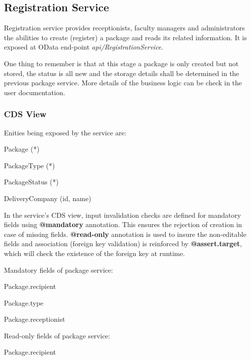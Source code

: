 \subsection{Registration Service}

Registration service provides receptionists, faculty managers and administrators the abilities to create (register) a package and reads its related information. It is exposed at OData end-point \textit{api/RegistrationService}. 

\bigskip
One thing to remember is that at this stage a package is only created but not stored, the status is all new and the storage details shall be determined in the previous package service. More details of the business logic can be check in the user documentation.

\subsubsection{CDS View}

Enities being exposed by the service are:
\begin{compactenum}
	\item Package (*)
    \item PackageType (*)
    \item PackageStatus (*)
    \item DeliveryCompany (id, name)
\end{compactenum}

\bigskip
In the service's CDS view, input invalidation checks are defined for mandatory fields using \textbf{@mandatory} annotation. This ensures the rejection of creation in case of missing fields. \textbf{@read-only} annotation is used to insure the non-editable fields and association (foreign key validation) is reinforced by \textbf{@assert.target}, which will check the existence of the foreign key at runtime.

\bigskip
Mandatory fields of package service:
\begin{compactenum}
	\item Package.recipient
    \item Package.type
    \item Package.receptionist
\end{compactenum}

\bigskip
Read-only fields of package service:
\begin{compactenum}
	\item Package.recipient
\end{compactenum}

